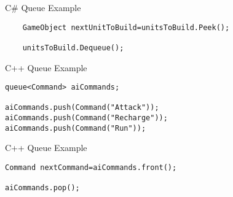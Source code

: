 \begin{frame}[fragile]{C\# Queue
	Example}
\begin{lstlisting}
	GameObject nextUnitToBuild=unitsToBuild.Peek();
	
	unitsToBuild.Dequeue();
\end{lstlisting}
\end{frame}

\begin{frame}[fragile]{C++ Queue
Example}
\begin{lstlisting}
queue<Command> aiCommands;

aiCommands.push(Command("Attack"));
aiCommands.push(Command("Recharge"));
aiCommands.push(Command("Run"));
\end{lstlisting}
\end{frame}

\begin{frame}[fragile]{C++ Queue
	Example}
\begin{lstlisting}
Command nextCommand=aiCommands.front();

aiCommands.pop();
\end{lstlisting}
\end{frame}